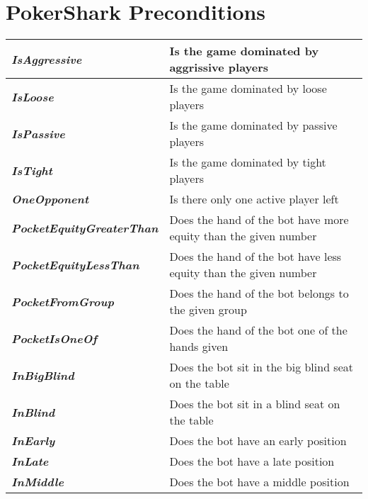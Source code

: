 \chapter{PokerShark Preconditions}
\label{appendix:pokerSharkPreconditions}


    \begin{tabular}{|l|l|}
    \hline
    \textit{\textbf{IsAggressive}}                & Is the game dominated by aggrissive players                     \\ \hline
    \textit{\textbf{IsLoose}}                     & Is the game dominated by loose players                          \\ \hline
    \textit{\textbf{IsPassive}}                   & Is the game dominated by passive players                        \\ \hline
    \textit{\textbf{IsTight}}                     & Is the game dominated by tight players                          \\ \hline
    \textit{\textbf{OneOpponent}}                 & Is there only one active player left                            \\ \hline
    \textit{\textbf{PocketEquityGreaterThan}}     & Does the hand of the bot have more equity than the given number \\ \hline
    \textit{\textbf{PocketEquityLessThan}}        & Does the hand of the bot have less equity than the given number \\ \hline
    \textit{\textbf{PocketFromGroup}}             & Does the hand of the bot belongs to the given group             \\ \hline
    \textit{\textbf{PocketIsOneOf}}               & Does the hand of the bot one of the hands given                 \\ \hline
    \textit{\textbf{InBigBlind}}                  & Does the bot sit in the big blind seat on the table             \\ \hline
    \textit{\textbf{InBlind}}                     & Does the bot sit in a blind seat on the table                   \\ \hline
    \textit{\textbf{InEarly}}                     & Does the bot have an early position                             \\ \hline
    \textit{\textbf{InLate}}                      & Does the bot have a late position                               \\ \hline
    \textit{\textbf{InMiddle}}                    & Does the bot have a middle position                             \\ \hline

\end{tabular}
